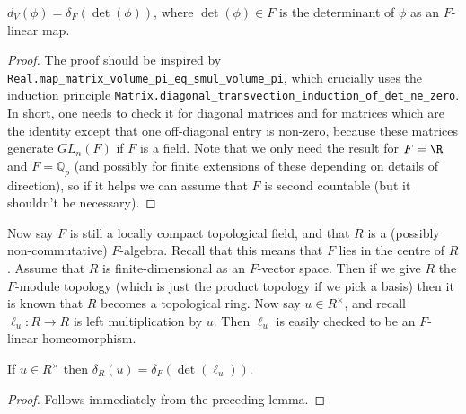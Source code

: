 \begin{lemma}
  \label{MeasureTheory.addEquivAddHaarChar_eq_ringHaarChar_det}
  \leanok
  $d_V(\phi)=\delta_F(\det(\phi))$, where $\det(\phi)\in F$ is the determinant of $\phi$ as an $F$-linear map.
\end{lemma}
\begin{proof}
The proof should be inspired by \href{https://leanprover-community.github.io/mathlib4\_docs/Mathlib/MeasureTheory/Measure/Lebesgue/Basic.html\#Real.map\_matrix\_volume\_pi\_eq\_smul\_volume\_pi}{\tt Real.map\_matrix\_volume\_pi\_eq\_smul\_volume\_pi},
which crucially uses the induction principle \href{https://leanprover-community.github.io/mathlib4\_docs/Mathlib/LinearAlgebra/Matrix/Transvection.html\#Matrix.diagonal\_transvection\_induction\_of\_det\_ne\_zero}{\tt Matrix.diagonal\_transvection\_induction\_of\_det\_ne\_zero}.
In short, one needs to check it for diagonal matrices and for matrices which are the identity
except that one off-diagonal entry is non-zero, because these matrices generate $GL_n(F)$
if $F$ is a field. Note that we only need the result for $F=\R$
and $F=\mathbb{Q}_p$ (and possibly for finite extensions of these depending on
details of direction), so if it helps we can assume that $F$ is second countable
(but it shouldn't be necessary).
\end{proof}

Now say $F$ is still a locally compact topological field, and that $R$ is a (possibly
non-commutative) $F$-algebra. Recall that this means that $F$ lies in the centre of $R$.
Assume that $R$ is finite-dimensional as an $F$-vector space. Then if we give $R$ the
$F$-module topology (which is just the product topology if we pick a basis) then it is known
that $R$ becomes a topological ring. Now say $u\in R^\times$, and
recall $\ell_u:R\to R$ is left multiplication by $u$. Then $\ell_u$ is easily checked to be
an $F$-linear homeomorphism.

  \begin{corollary}
  \label{MeasureTheory.algebra_ringHaarChar_eq_ringHaarChar_det}
  \leanok
  If $u\in R^\times$ then $\delta_R(u)=\delta_F(\det(\ell_u))$.
\end{corollary}
\begin{proof}
  \leanok
  Follows immediately from the preceding lemma.
\end{proof}

